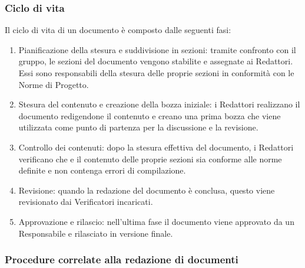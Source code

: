 \subsubsection{Ciclo di vita}
Il ciclo di vita di un documento è composto dalle seguenti fasi:
\begin{enumerate}
    \item Pianificazione della stesura e suddivisione in sezioni: tramite confronto con il gruppo, le sezioni del documento vengono stabilite e assegnate ai Redattori.
    Essi sono responsabili della stesura delle proprie sezioni in conformità con le Norme di Progetto.
    \item Stesura del contenuto e creazione della bozza iniziale: i Redattori realizzano il documento redigendone il contenuto e creano una prima bozza
    che viene utilizzata come punto di partenza per la discussione e la revisione.
    \item Controllo dei contenuti: dopo la stesura effettiva del documento, i Redattori verificano che e il contenuto delle proprie sezioni
    sia conforme alle norme definite e non contenga errori di compilazione.
    \item Revisione: quando la redazione del documento è conclusa, questo viene revisionato dai Verificatori incaricati.
    \item Approvazione e rilascio: nell'ultima fase il documento viene approvato da un Responsabile e rilasciato in versione finale.
\end{enumerate}

\subsubsection{Procedure correlate alla redazione di documenti}

